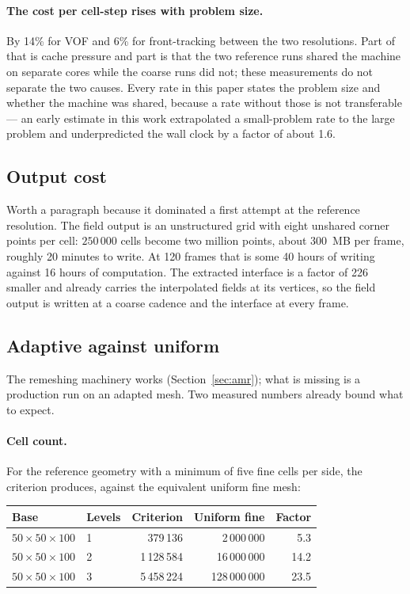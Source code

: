 \paragraph{The cost per cell-step rises with problem size.}
By 14\% for VOF and 6\% for front-tracking between the two resolutions. Part of
that is cache pressure and part is that the two reference runs shared the
machine on separate cores while the coarse runs did not; these measurements do
not separate the two causes. Every rate in this paper states the problem size
and whether the machine was shared, because a rate without those is not
transferable --- an early estimate in this work extrapolated a small-problem
rate to the large problem and underpredicted the wall clock by a factor of about
1.6.

\subsection{Output cost}

Worth a paragraph because it dominated a first attempt at the reference
resolution. The field output is an unstructured grid with eight unshared corner
points per cell: $250\,000$ cells become two million points, about 300~MB per
frame, roughly 20 minutes to write. At 120 frames that is some 40 hours of
writing against 16 hours of computation. The extracted interface is a factor of
226 smaller and already carries the interpolated fields at its vertices, so the
field output is written at a coarse cadence and the interface at every frame.

\subsection{Adaptive against uniform}

The remeshing machinery works (Section~\ref{sec:amr}); what is missing is a
production run on an adapted mesh. Two measured numbers already bound what to
expect.

\paragraph{Cell count.} For the reference geometry with a minimum of five fine
cells per side, the criterion produces, against the equivalent uniform fine
mesh:

\begin{center}
\small
\begin{tabular}{llrrr}
\toprule
Base & Levels & Criterion & Uniform fine & Factor \\
\midrule
$50\times50\times100$ & 1 & 379\,136 & 2\,000\,000 & 5.3 \\
$50\times50\times100$ & 2 & 1\,128\,584 & 16\,000\,000 & 14.2 \\
$50\times50\times100$ & 3 & 5\,458\,224 & 128\,000\,000 & 23.5 \\
\bottomrule
\end{tabular}
\end{center}

